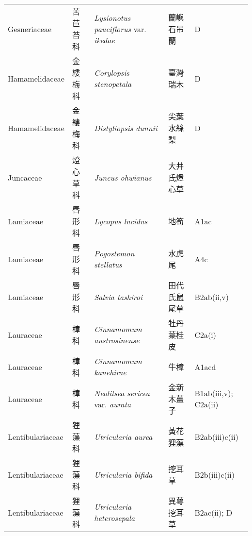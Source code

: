 {\begin{longtable}{p{2.5cm}p{2.5cm}p{4.5cm}p{2.5cm}p{3cm}}
    Gesneriaceae & 苦苣苔科 & \textit{Lysionotus pauciflorus} var. \textit{ikedae}  & 蘭嶼石吊蘭 & D \index{Lysionotus@\textit{Lysionotus}!pauciflorus@\textit{pauciflorus}!var. ikedae@var. \textit{ikedae}}  \index{蘭嶼石吊蘭} \\
    Hamamelidaceae & 金縷梅科 & \textit{Corylopsis stenopetala}  & 臺灣瑞木 & D \index{Corylopsis@\textit{Corylopsis}!stenopetala@\textit{stenopetala}}  \index{臺灣瑞木} \\
    Hamamelidaceae & 金縷梅科 & \textit{Distyliopsis dunnii}  & 尖葉水絲梨 & D \index{Distyliopsis@\textit{Distyliopsis}!dunnii@\textit{dunnii}}  \index{尖葉水絲梨} \\
    Juncaceae & 燈心草科 & \textit{Juncus ohwianus}  & 大井氏燈心草 &  \index{Juncus@\textit{Juncus}!ohwianus@\textit{ohwianus}}  \index{大井氏燈心草} \\
    Lamiaceae & 唇形科 & \textit{Lycopus lucidus}  & 地筍 & A1ac \index{Lycopus@\textit{Lycopus}!lucidus@\textit{lucidus}}  \index{地筍} \\
    Lamiaceae & 唇形科 & \textit{Pogostemon stellatus}  & 水虎尾 & A4c \index{Pogostemon@\textit{Pogostemon}!stellatus@\textit{stellatus}}  \index{水虎尾} \\
    Lamiaceae & 唇形科 & \textit{Salvia tashiroi}  & 田代氏鼠尾草 & B2ab(ii,v) \index{Salvia@\textit{Salvia}!tashiroi@\textit{tashiroi}}  \index{田代氏鼠尾草} \\
    Lauraceae & 樟科 & \textit{Cinnamomum austrosinense}  & 牡丹葉桂皮 & C2a(i) \index{Cinnamomum@\textit{Cinnamomum}!austrosinense@\textit{austrosinense}}  \index{牡丹葉桂皮} \\
    Lauraceae & 樟科 & \textit{Cinnamomum kanehirae}  & 牛樟 & A1acd \index{Cinnamomum@\textit{Cinnamomum}!kanehirae@\textit{kanehirae}}  \index{牛樟} \\
    Lauraceae & 樟科 & \textit{Neolitsea sericea} var. \textit{aurata}  & 金新木薑子 & B1ab(iii,v); C2a(ii) \index{Neolitsea@\textit{Neolitsea}!sericea@\textit{sericea}!var. aurata@var. \textit{aurata}}  \index{金新木薑子} \\
    Lentibulariaceae & 狸藻科 & \textit{Utricularia aurea}  & 黃花狸藻 & B2ab(iii)c(ii) \index{Utricularia@\textit{Utricularia}!aurea@\textit{aurea}}  \index{黃花狸藻} \\
    Lentibulariaceae & 狸藻科 & \textit{Utricularia bifida}  & 挖耳草 & B2b(iii)c(ii) \index{Utricularia@\textit{Utricularia}!bifida@\textit{bifida}}  \index{挖耳草} \\
    Lentibulariaceae & 狸藻科 & \textit{Utricularia heterosepala}  & 異萼挖耳草 & B2ac(ii); D \index{Utricularia@\textit{Utricularia}!heterosepala@\textit{heterosepala}}  \index{異萼挖耳草} \\

\end{longtable}}
